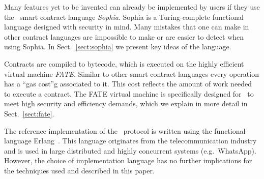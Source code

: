 Many features yet to be invented can already be implemented
by users if they use the \aet\ smart contract language
\textit{Sophia}. Sophia is a Turing-complete functional language
designed with security in mind. Many mistakes that one can make in
other contract languages are impossible to make or are easier to detect
when using Sophia. In Sect.\ \ref{sect:sophia} we present key
ideas of the language.

Contracts are compiled to bytecode, which is executed on the highly
efficient virtual machine \textit{FATE}. Similar to other smart contract
languages every operation has a \enquote{gas cost}g associated to it. This cost
reflects
the amount of work needed to execute a contract. The FATE virtual machine is
specifically designed for
\aet\ to meet high security and efficiency demands, which we
explain in more detail in Sect.~\ref{sect:fate}.

The reference implementation of the \aet\ protocol is written using the
functional language Erlang~\cite{Armstrong:2010:ERL:1810891.1810910}. This
language originates from the telecommunication industry and is used in large
distributed and highly concurrent systems (e.g.\ WhatsApp). However, the choice
of implementation language has no further implications for the techniques used
and described in this paper.
